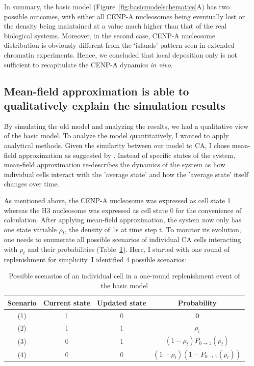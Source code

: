 In summary, the basic model (Figure~\ref{fig:basicmodelschematics}A) has two possible outcomes, with either all CENP-A nucleosomes being eventually lost or the density being maintained at a value much higher than that of the real biological systems. Moreover, in the second case, CENP-A nucleosome distribution is obviously different from the ‘islands’ pattern seen in extended chromatin experiments. Hence, we concluded that local deposition only is not sufficient to recapitulate the CENP-A dynamics \textit{in vivo}.

\subsection{Mean-field approximation is able to qualitatively explain the simulation results}

By simulating the old model and analyzing the results, we had a qualitative view of the basic model. To analyze the model
quantitatively, I wanted to apply analytical methods. Given the similarity between our model to CA, I chose mean-field
approximation as suggested by \citep{Sayama2013IntroductionSystems}. Instead of specific states of the system, mean-field approximation re-describes the dynamics of the system as how individual cells interact with the ’average state’ and how the ’average state’ itself changes over time. 

As mentioned above, the CENP-A nucleosome was expressed as cell state 1 whereas the H3 nucleosome was expressed as cell state 0 for the convenience of calculation. After applying mean-field approximation, the system now only has one state variable $\rho_{t}$, the density of 1s at time step t. To monitor its evolution, one needs to enumerate all possible scenarios of individual CA cells interacting with $\rho_{t}$ and their probabilities (Table~\ref{tab:MFAscenariosBasic}). Here, I started with one round of replenishment for simplicity. I identified 4 possible scenarios:

\begin{table}[htbp]
\centering
\caption{Possible scenarios of an individual cell in a one-round replenishment event of the basic model}
\label{tab:MFAscenariosBasic}
\begin{tabular}{cccc}
\hline
\textbf{Scenario} & \textbf{Current state} & \textbf{Updated state} & \textbf{Probability} \\ \hline
(1) & 1                        & 0                      & 0                    \\
(2) & 1                        & 1                      & $\rho_{t}$                    \\
(3) & 0                        & 1                      & $(1 - \rho_{t})P_{0\rightarrow 1}(\rho_{t})$     \\
(4) & 0                        & 0                      & $(1 - \rho_{t})(1 - P_{0\rightarrow 1}(\rho_{t}))$ \\ \hline
\end{tabular}
\end{table}


